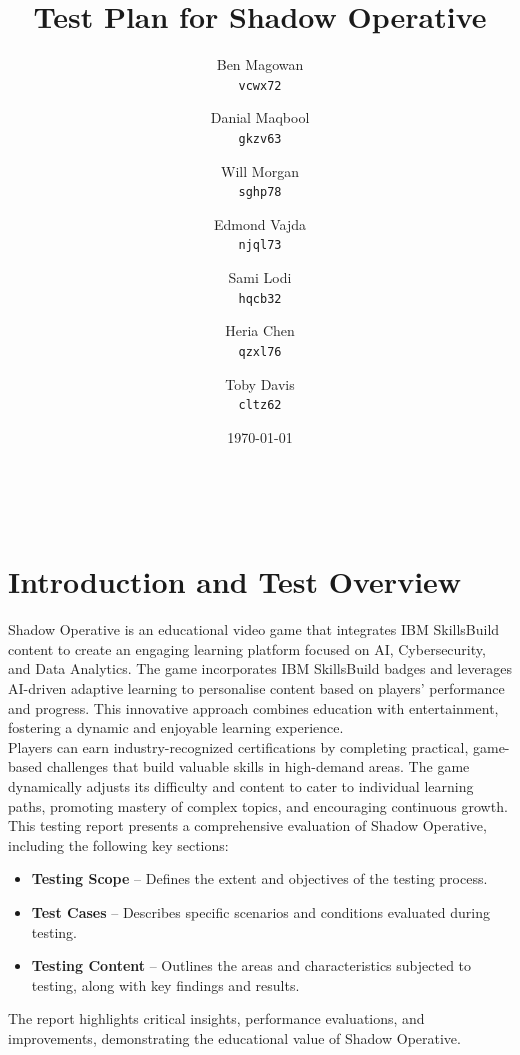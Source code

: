 \documentclass[11pt, a4paper]{article}
\title{Test Plan for Shadow Operative}
\date{\today}
\author{
    Ben Magowan \\
    \texttt{vcwx72}
    \and
    Danial Maqbool \\
    \texttt{gkzv63}
    \and
    Will Morgan \\
    \texttt{sghp78}
    \and
    Edmond Vajda \\
    \texttt{njql73} \\
    \and
    Sami Lodi \\
    \texttt{hqcb32}
    \and
    Heria Chen \\
    \texttt{qzxl76}
    \and
    Toby Davis \\
    \texttt{cltz62}
}
\begin{document}
\maketitle

\begin{center}
     \\
\end{center}

\newpage

\tableofcontents

\newpage

\section{Introduction and Test Overview}

\noindent Shadow Operative is an educational video game that integrates IBM SkillsBuild content to create an engaging learning platform focused on AI, Cybersecurity, and Data Analytics. The game incorporates IBM SkillsBuild badges and leverages AI-driven adaptive learning to personalise content based on players' performance and progress. This innovative approach combines education with entertainment, fostering a dynamic and enjoyable learning experience. \\

\noindent Players can earn industry-recognized certifications by completing practical, game-based challenges that build valuable skills in high-demand areas. The game dynamically adjusts its difficulty and content to cater to individual learning paths, promoting mastery of complex topics, and encouraging continuous growth. \\

\noindent This testing report presents a comprehensive evaluation of Shadow Operative, including the following key sections:
\begin{itemize}
    \item \textbf{Testing Scope} – Defines the extent and objectives of the testing process.
    \item \textbf{Test Cases} – Describes specific scenarios and conditions evaluated during testing.
    \item \textbf{Testing Content} – Outlines the areas and characteristics subjected to testing, along with key findings and results.
\end{itemize}

\noindent The report highlights critical insights, performance evaluations, and improvements, demonstrating the educational value of Shadow Operative.
\end{document}
